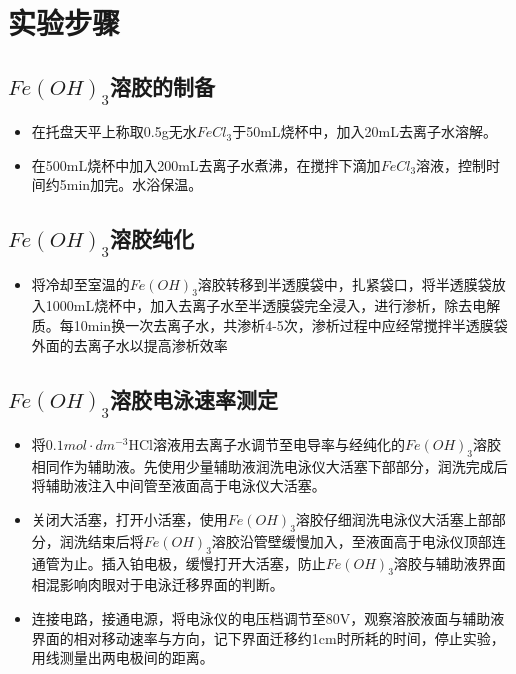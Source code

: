 \documentclass[12pt,hyperref,a4paper,UTF8]{ctexart}
\begin{document}
\section{实验步骤}
\subsection{$Fe(OH)_3$溶胶的制备}
    
    \begin{itemize}
        \item 在托盘天平上称取0.5g无水$FeCl_3$于50mL烧杯中，加入20mL去离子水溶解。
        \item  在500mL烧杯中加入200mL去离子水煮沸，在搅拌下滴加$FeCl_3$溶液，控制时间约5min加完。水浴保温。
    \end{itemize}

\subsection{$Fe(OH)_3$溶胶纯化}
 \begin{itemize}
 	\item     将冷却至室温的$Fe(OH)_3$溶胶转移到半透膜袋中，扎紧袋口，将半透膜袋放入1000mL烧杯中，加入去离子水至半透膜袋完全浸入，进行渗析，除去电解质。每10min换一次去离子水，共渗析4-5次，渗析过程中应经常搅拌半透膜袋外面的去离子水以提高渗析效率
 \end{itemize}   

\subsection{$Fe(OH)_3$溶胶电泳速率测定}

    \begin{itemize}
        \item 将$0.1mol\cdot dm^{-3}$HCl溶液用去离子水调节至电导率与经纯化的$Fe(OH)_3$溶胶相同作为辅助液。先使用少量辅助液润洗电泳仪大活塞下部部分，润洗完成后将辅助液注入中间管至液面高于电泳仪大活塞。

        \item 关闭大活塞，打开小活塞，使用$Fe(OH)_3$溶胶仔细润洗电泳仪大活塞上部部分，润洗结束后将$Fe(OH)_3$溶胶沿管壁缓慢加入，至液面高于电泳仪顶部连通管为止。插入铂电极，缓慢打开大活塞，防止$Fe(OH)_3$溶胶与辅助液界面相混影响肉眼对于电泳迁移界面的判断。

        \item 连接电路，接通电源，将电泳仪的电压档调节至80V，观察溶胶液面与辅助液界面的相对移动速率与方向，记下界面迁移约1cm时所耗的时间，停止实验，用线测量出两电极间的距离。

    \end{itemize}
\end{document}
